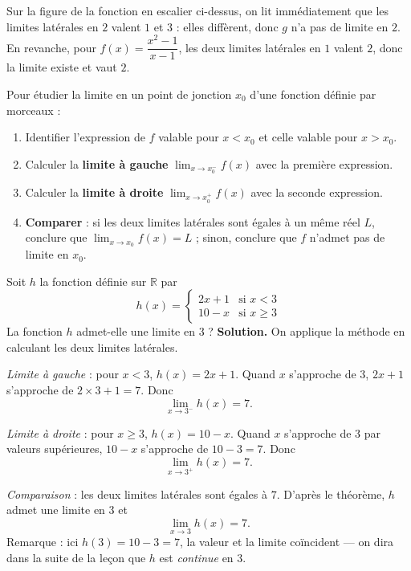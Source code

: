 \documentclass[11pt]{article}
\begin{document}
Sur la figure de la fonction en escalier ci-dessus, on lit immédiatement que les limites latérales en $2$ valent $1$ et $3$ : elles diffèrent, donc $g$ n'a pas de limite en $2$. En revanche, pour $f(x)=\dfrac{x^2-1}{x-1}$, les deux limites latérales en $1$ valent $2$, donc la limite existe et vaut $2$.

\begin{methode}
Pour étudier la limite en un point de jonction $x_0$ d'une fonction définie par morceaux :
\begin{enumerate}
\item Identifier l'expression de $f$ valable pour $x < x_0$ et celle valable pour $x > x_0$.
\item Calculer la \textbf{limite à gauche} $\displaystyle\lim_{x \to x_0^{-}} f(x)$ avec la première expression.
\item Calculer la \textbf{limite à droite} $\displaystyle\lim_{x \to x_0^{+}} f(x)$ avec la seconde expression.
\item \textbf{Comparer} : si les deux limites latérales sont égales à un même réel $L$, conclure que $\displaystyle\lim_{x \to x_0} f(x) = L$ ; sinon, conclure que $f$ n'admet pas de limite en $x_0$.
\end{enumerate}
\end{methode}

\begin{exoresolu}
Soit $h$ la fonction définie sur $\mathbb{R}$ par
\[ h(x) = \begin{cases} 2x + 1 & \text{si } x < 3 \\ 10 - x & \text{si } x \geq 3 \end{cases} \]
La fonction $h$ admet-elle une limite en $3$ ?
\tcblower
\textbf{Solution.} On applique la méthode en calculant les deux limites latérales.

\emph{Limite à gauche} : pour $x < 3$, $h(x) = 2x+1$. Quand $x$ s'approche de $3$, $2x+1$ s'approche de $2\times 3 + 1 = 7$. Donc
\[ \lim_{x \to 3^{-}} h(x) = 7. \]

\emph{Limite à droite} : pour $x \geq 3$, $h(x) = 10 - x$. Quand $x$ s'approche de $3$ par valeurs supérieures, $10-x$ s'approche de $10 - 3 = 7$. Donc
\[ \lim_{x \to 3^{+}} h(x) = 7. \]

\emph{Comparaison} : les deux limites latérales sont égales à $7$. D'après le théorème, $h$ admet une limite en $3$ et
\[ \lim_{x \to 3} h(x) = 7. \]
Remarque : ici $h(3) = 10 - 3 = 7$, la valeur et la limite coïncident — on dira dans la suite de la leçon que $h$ est \emph{continue} en $3$.
\end{exoresolu}
\end{document}
